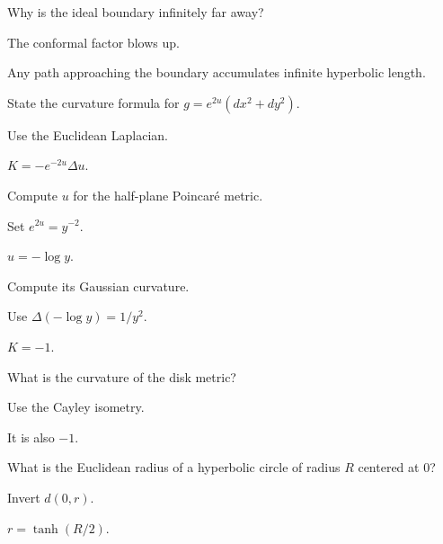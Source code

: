 \begin{exercise}\label{exr:vii32-15}
Why is the ideal boundary infinitely far away?
\end{exercise}
\begin{hint}
The conformal factor blows up.
\end{hint}
\begin{solution}
Any path approaching the boundary accumulates infinite hyperbolic length.
\end{solution}

\begin{exercise}\label{exr:vii32-16}
State the curvature formula for \(g=e^{2u}(dx^2+dy^2)\).
\end{exercise}
\begin{hint}
Use the Euclidean Laplacian.
\end{hint}
\begin{solution}
\(K=-e^{-2u}\Delta u\).
\end{solution}

\begin{exercise}\label{exr:vii32-17}
Compute \(u\) for the half-plane Poincaré metric.
\end{exercise}
\begin{hint}
Set \(e^{2u}=y^{-2}\).
\end{hint}
\begin{solution}
\(u=-\log y\).
\end{solution}

\begin{exercise}\label{exr:vii32-18}
Compute its Gaussian curvature.
\end{exercise}
\begin{hint}
Use \(\Delta(-\log y)=1/y^2\).
\end{hint}
\begin{solution}
\(K=-1\).
\end{solution}

\begin{exercise}\label{exr:vii32-19}
What is the curvature of the disk metric?
\end{exercise}
\begin{hint}
Use the Cayley isometry.
\end{hint}
\begin{solution}
It is also \(-1\).
\end{solution}

\begin{exercise}\label{exr:vii32-20}
What is the Euclidean radius of a hyperbolic circle of radius \(R\) centered at \(0\)?
\end{exercise}
\begin{hint}
Invert \(d(0,r)\).
\end{hint}
\begin{solution}
\(r=\tanh(R/2)\).
\end{solution}

